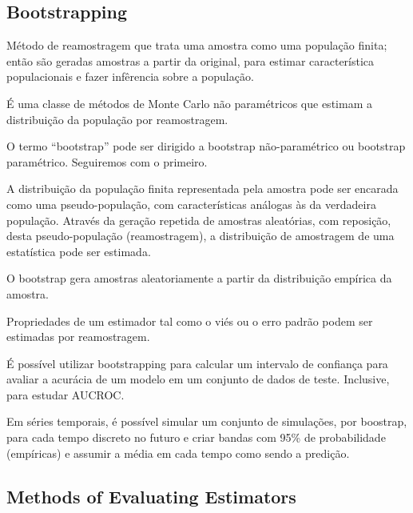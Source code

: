 \subsection{Bootstrapping}
Método de reamostragem que trata uma amostra como uma população finita; então são geradas amostras a partir da original, para estimar característica populacionais e fazer infêrencia sobre a população.

É uma classe de métodos de Monte Carlo não paramétricos que estimam a distribuição da população por reamostragem.

O termo “bootstrap” pode ser dirigido a bootstrap não-paramétrico ou bootstrap
paramétrico. Seguiremos com o primeiro.

A distribuição da população finita representada pela amostra pode ser encarada como uma pseudo-população, com características análogas às da verdadeira população. Através da geração repetida de amostras aleatórias, com reposição, desta pseudo-população (reamostragem), a distribuição de amostragem de uma estatística pode ser estimada. 

O bootstrap gera amostras aleatoriamente a partir da distribuição empírica da amostra.

Propriedades de um estimador tal como o viés ou o erro padrão podem ser estimadas
por reamostragem.


É possível utilizar bootstrapping para calcular um intervalo de confiança para avaliar a acurácia de um modelo em um conjunto de dados de teste. Inclusive, para estudar AUCROC.

Em séries temporais, é possível simular um conjunto de simulações, por boostrap, para cada tempo discreto no futuro e criar bandas com 95\% de probabilidade (empíricas) e assumir a média em cada tempo como sendo a predição.

\subsection{Methods of Evaluating Estimators}

